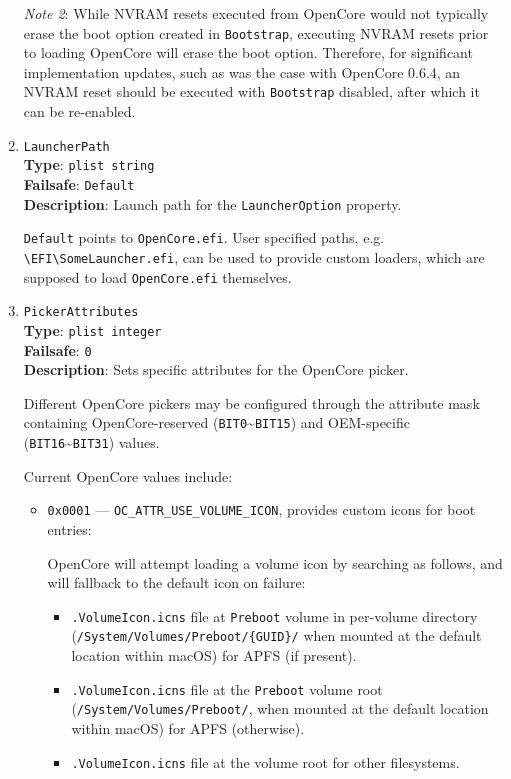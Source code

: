 \documentclass[]{article}
\providecommand{\tightlist}{%
  \setlength{\itemsep}{0pt}\setlength{\parskip}{0pt}}
\begin{document}
\begin{enumerate}
  \emph{Note 2}: While NVRAM resets executed from OpenCore would not typically erase the boot option
  created in \texttt{Bootstrap}, executing NVRAM resets prior to loading OpenCore will erase the boot
  option. Therefore, for significant implementation updates, such as was the case with OpenCore 0.6.4,
  an NVRAM reset should be executed with \texttt{Bootstrap} disabled, after which it can be re-enabled.

\item
  \texttt{LauncherPath}\\
  \textbf{Type}: \texttt{plist\ string}\\
  \textbf{Failsafe}: \texttt{Default}\\
  \textbf{Description}: Launch path for the \texttt{LauncherOption} property.

  \texttt{Default} points to \texttt{OpenCore.efi}. User specified paths,
  e.g. \texttt{\textbackslash EFI\textbackslash SomeLauncher.efi},
  can be used to provide custom loaders, which are supposed to
  load \texttt{OpenCore.efi} themselves.

\item
  \texttt{PickerAttributes}\\
  \textbf{Type}: \texttt{plist\ integer}\\
  \textbf{Failsafe}: \texttt{0}\\
  \textbf{Description}: Sets specific attributes for the OpenCore picker.

  Different OpenCore pickers may be configured through the attribute mask containing
  OpenCore-reserved (\texttt{BIT0}\textasciitilde\texttt{BIT15}) and OEM-specific
  (\texttt{BIT16}\textasciitilde\texttt{BIT31}) values.

  Current OpenCore values include:

  \begin{itemize}
  \tightlist
  \item \texttt{0x0001} --- \texttt{OC\_ATTR\_USE\_VOLUME\_ICON}, provides custom icons
    for boot entries:

    OpenCore will attempt loading a volume icon by searching
    as follows, and will fallback to the default icon on failure:
    \begin{itemize}
    \tightlist
      \item \texttt{.VolumeIcon.icns} file at \texttt{Preboot} volume in per-volume directory
       (\texttt{/System/Volumes/Preboot/\{GUID\}/} when mounted at the default location within
       macOS) for APFS (if present).
      \item \texttt{.VolumeIcon.icns} file at the \texttt{Preboot} volume root
      (\texttt{/System/Volumes/Preboot/}, when mounted at the default location within macOS)
      for APFS (otherwise).
      \item \texttt{.VolumeIcon.icns} file at the volume root for other filesystems.
    \end{itemize} \medskip


\end{itemize}
\end{enumerate}
\end{document}
